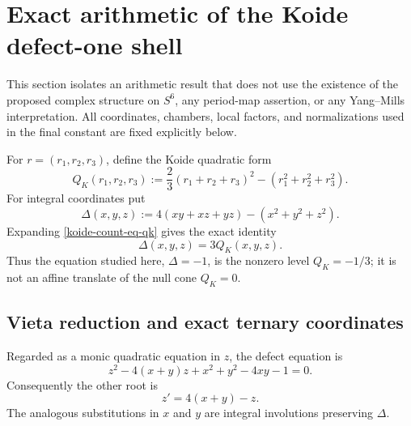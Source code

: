 
\section{Exact arithmetic of the Koide defect-one shell}
\label{koide-count-sec-main}

This section isolates an arithmetic result that does not use the existence of
the proposed complex structure on \(S^6\), any period-map assertion, or any
Yang--Mills interpretation.  All coordinates, chambers, local factors, and
normalizations used in the final constant are fixed explicitly below.

For \(r=(r_1,r_2,r_3)\), define the Koide quadratic form
\begin{equation}
 Q_K(r_1,r_2,r_3)
 :=\frac23(r_1+r_2+r_3)^2-(r_1^2+r_2^2+r_3^2).
 \label{koide-count-eq-qk}
\end{equation}
For integral coordinates put
\begin{equation}
 \Delta(x,y,z):=4(xy+xz+yz)-(x^2+y^2+z^2).
 \label{koide-count-eq-defect}
\end{equation}
Expanding \eqref{koide-count-eq-qk} gives the exact identity
\begin{equation}
 \Delta(x,y,z)=3Q_K(x,y,z).
 \label{koide-count-eq-defect-qk}
\end{equation}
Thus the equation studied here,
\(\Delta=-1\), is the nonzero level \(Q_K=-1/3\); it is not an affine
translate of the null cone \(Q_K=0\).

\subsection{Vieta reduction and exact ternary coordinates}
\label{koide-count-subsec-vieta}

Regarded as a monic quadratic equation in \(z\), the defect equation is
\begin{equation}
 z^2-4(x+y)z+x^2+y^2-4xy-1=0.
 \label{koide-count-eq-monic-z}
\end{equation}
Consequently the other root is
\begin{equation}
 z'=4(x+y)-z.
 \label{koide-count-eq-vieta-root}
\end{equation}
The analogous substitutions in \(x\) and \(y\) are integral involutions
preserving \(\Delta\).

